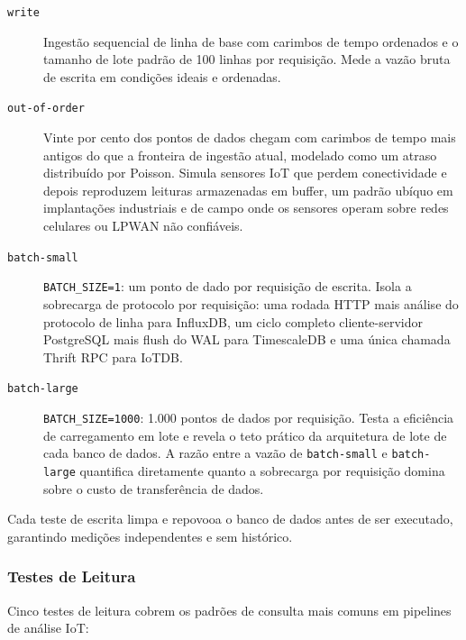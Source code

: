 \begin{description}
  \item[\texttt{write}] Ingestão sequencial de linha de base com carimbos de tempo ordenados e
    o tamanho de lote padrão de 100 linhas por requisição. Mede a vazão bruta de escrita em
    condições ideais e ordenadas.

  \item[\texttt{out-of-order}] Vinte por cento dos pontos de dados chegam com carimbos de tempo
    mais antigos do que a fronteira de ingestão atual, modelado como um atraso distribuído por
    Poisson. Simula sensores IoT que perdem conectividade e depois reproduzem leituras
    armazenadas em buffer, um padrão ubíquo em implantações industriais e de campo onde os
    sensores operam sobre redes celulares ou LPWAN não confiáveis.

  \item[\texttt{batch-small}] \texttt{BATCH\_SIZE=1}: um ponto de dado por requisição de
    escrita. Isola a sobrecarga de protocolo por requisição: uma rodada HTTP mais análise do
    protocolo de linha para InfluxDB, um ciclo completo cliente-servidor PostgreSQL mais flush
    do WAL para TimescaleDB e uma única chamada Thrift RPC para IoTDB.

  \item[\texttt{batch-large}] \texttt{BATCH\_SIZE=1000}: 1.000 pontos de dados por requisição.
    Testa a eficiência de carregamento em lote e revela o teto prático da arquitetura de lote de
    cada banco de dados. A razão entre a vazão de \texttt{batch-small} e \texttt{batch-large}
    quantifica diretamente quanto a sobrecarga por requisição domina sobre o custo de
    transferência de dados.
\end{description}

Cada teste de escrita limpa e repovooa o banco de dados antes de ser executado, garantindo
medições independentes e sem histórico.

\subsubsection{Testes de Leitura}

Cinco testes de leitura cobrem os padrões de consulta mais comuns em pipelines de análise IoT:

